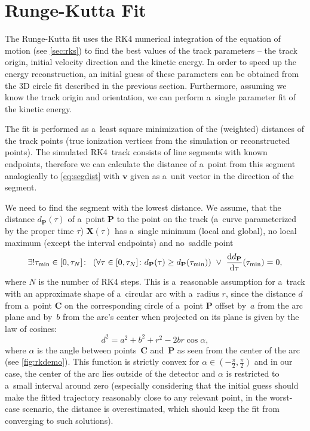 	\section{Runge-Kutta Fit}
	\label{sec:rkfit}
		The Runge-Kutta fit uses the \acf{RK4} numerical integration of the equation of motion (see \cref{sec:rks}) to find the best values of the track parameters -- the track origin, initial velocity direction and the kinetic energy. In order to speed up the energy reconstruction, an initial guess of these parameters can be obtained from the 3D circle fit described in the previous section. Furthermore, assuming we know the track origin and orientation, we can perform a~single parameter fit of the kinetic energy.
		
		The fit is performed as a~least square minimization of the (weighted) distances of the track points (true ionization vertices from the simulation or reconstructed points). The simulated \ac{RK4}~track consists of line segments with known endpoints, therefore we can calculate the distance of a~point from this segment analogically to \cref{eq:segdist} with $\mathbf{v}$ given as a~unit vector in the direction of the segment.
		
		We need to find the segment with the lowest distance. We assume, that the distance $d_\mathbf{P}(\tau)$ of a~point $\mathbf{P}$ to the point on the track (a~curve parameterized by the proper time $\tau$) $\mathbf{X}(\tau)$ has a~single minimum (local and global), no local maximum (except the interval endpoints) and no~saddle point
			\begin{equation}
				\label{eq:rk_assum}
				\exists!\tau_\text{min}\in[0,\tau_N]\colon\ \left(\forall\tau\in[0,\tau_N]\colon  d_{\mathbf{P}}(\tau) \geq d_{\mathbf{P}}(\tau_\text{min})\right)\ \lor\ \dv{d_{\mathbf{P}}}{\tau}{(\tau_\text{min})} = 0,
			\end{equation}
		where $N$ is the number of \ac{RK4} steps. This is a~reasonable assumption for a~track with an approximate shape of a~circular arc with a~radius $r$, since the distance $d$ from a~point $\mathbf{C}$ on the corresponding circle of a~point $\mathbf{P}$ offset by~$a$ from the arc plane and by~$b$ from the arc's center when projected on its plane is given by the law of cosines:
			\begin{equation}
				\label{eq:rkdemo}
				d^2 = a^2+b^2+r^2 - 2br\cos\alpha,
			\end{equation}
		where $\alpha$ is the angle between points~$\mathbf{C}$ and~$\mathbf{P}$ as seen from the center of the arc (see \cref{fig:rkdemo}). This function is strictly convex for $\alpha\in\left(-\frac{\pi}{2},\frac{\pi}{2}\right)$ and in our case, the center of the arc lies outside of the detector and $\alpha$ is restricted to a~small interval around zero (especially considering that the initial guess should make the fitted trajectory reasonably close to any relevant point, in the worst-case scenario, the distance is overestimated, which should keep the fit from converging to such solutions).
		
